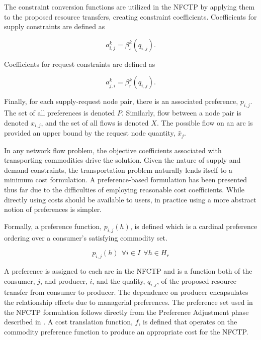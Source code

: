 The constraint conversion functions are utilized in the NFCTP by applying them
to the proposed resource transfers, creating constraint
coefficients. Coefficients for supply constraints are defined as

\begin{equation}
  a^k_{i, j} = \beta_s^k(q_{i,j}).
\end{equation}

\noindent
Coefficients for request constraints are defined as

\begin{equation}
  a^k_{j, i} = \beta_r^k(q_{i,j}).
\end{equation}

Finally, for each supply-request node pair, there is an associated preference,
$p_{i, j}$. The set of all preferences is denoted $P$. Similarly, flow between a
node pair is denoted $x_{i, j}$, and the set of all flows is denoted $X$. The
possible flow on an arc is provided an upper bound by the request node quantity,
$\widetilde{x_j}$.


In any network flow problem, the objective coefficients associated with
transporting commodities drive the solution. Given the nature of supply and
demand constraints, the transportation problem naturally lends itself to a
minimum cost formulation. A preference-based formulation has been presented thus
far due to the difficulties of employing reasonable cost coefficients. While
directly using costs should be available to users, in practice using a more
abstract notion of preferences is simpler.

Formally, a preference function, $p_{i, j}(h)$, is defined which is a cardinal
preference ordering over a consumer's satisfying commodity set.
 
\begin{equation}
p_{i, j}(h) \:\: \forall i \in I  \:\: \forall h \in H_{r} 
\end{equation}

\noindent
A preference is assigned to each arc in the NFCTP and is a function both of the
consumer, $j$, and producer, $i$, and the quality, $q_{i, j}$, of the proposed
resource transfer from consumer to producer. The dependence on producer
encapsulates the relationship effects due to managerial preferences. The
preference set used in the NFCTP formulation follows directly from the
Preference Adjustment phase described in . A cost
translation function, $f$, is defined that operates on the commodity preference
function to produce an appropriate cost for the NFCTP.

